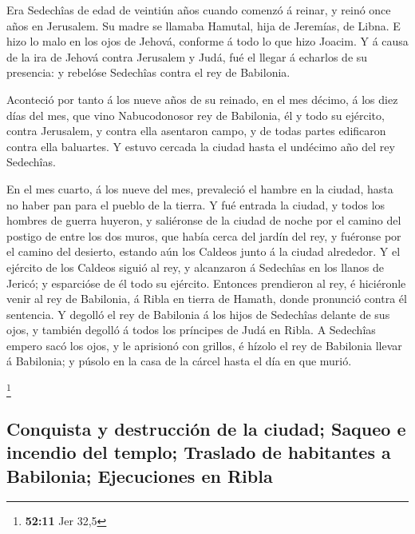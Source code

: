  Era Sedechîas de edad de veintiún años cuando comenzó á
reinar, y reinó once años en Jerusalem. Su madre se llamaba Hamutal,
hija de Jeremías, de Libna.  E hizo lo malo en los ojos de
Jehová, conforme á todo lo que hizo Joacim.  Y á causa de la
ira de Jehová contra Jerusalem y Judá, fué el llegar á echarlos de su
presencia: y rebelóse Sedechîas contra el rey de Babilonia.

 Aconteció por tanto á los nueve años de su reinado, en el
mes décimo, á los diez días del mes, que vino Nabucodonosor rey de
Babilonia, él y todo su ejército, contra Jerusalem, y contra ella
asentaron campo, y de todas partes edificaron contra ella baluartes.
 Y estuvo cercada la ciudad hasta el undécimo año del rey
Sedechîas.

 En el mes cuarto, á los nueve del mes, prevaleció el hambre
en la ciudad, hasta no haber pan para el pueblo de la tierra.
 Y fué entrada la ciudad, y todos los hombres de guerra
huyeron, y saliéronse de la ciudad de noche por el camino del postigo de
entre los dos muros, que había cerca del jardín del rey, y fuéronse por
el camino del desierto, estando aún los Caldeos junto á la ciudad
alrededor.  Y el ejército de los Caldeos siguió al rey, y
alcanzaron á Sedechîas en los llanos de Jericó; y esparcióse de él todo
su ejército.  Entonces prendieron al rey, é hiciéronle venir
al rey de Babilonia, á Ribla en tierra de Hamath, donde pronunció contra
él sentencia.  Y degolló el rey de Babilonia á los hijos de
Sedechîas delante de sus ojos, y también degolló á todos los príncipes
de Judá en Ribla.  A Sedechîas empero sacó los ojos, y le
aprisionó con grillos, é hízolo el rey de Babilonia llevar á Babilonia;
y púsolo en la casa de la cárcel hasta el día en que murió.

\footnote{\textbf{52:11} Jer 32,5}

\hypertarget{conquista-y-destrucciuxf3n-de-la-ciudad-saqueo-e-incendio-del-templo-traslado-de-habitantes-a-babilonia-ejecuciones-en-ribla}{%
\subsection{Conquista y destrucción de la ciudad; Saqueo e incendio del
templo; Traslado de habitantes a Babilonia; Ejecuciones en
Ribla}\label{conquista-y-destrucciuxf3n-de-la-ciudad-saqueo-e-incendio-del-templo-traslado-de-habitantes-a-babilonia-ejecuciones-en-ribla}}

